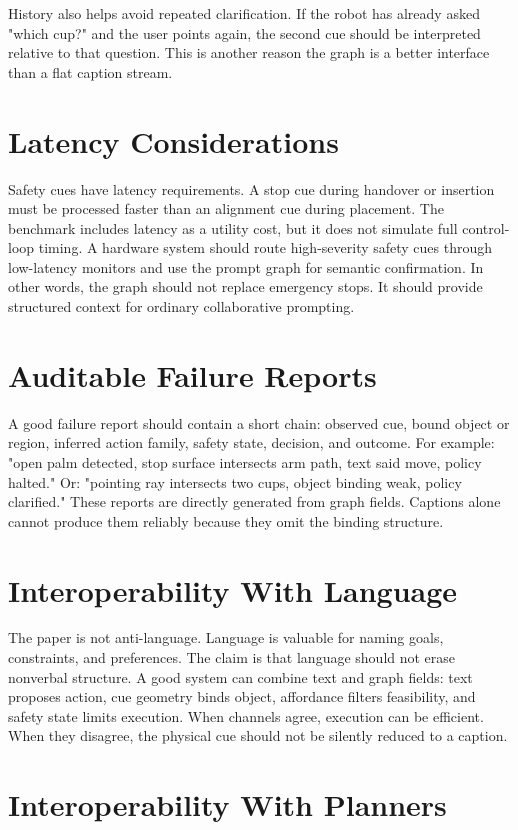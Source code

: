 \documentclass{article}
\begin{document}
History also helps avoid repeated clarification. If the robot has already asked "which cup?" and the user points again, the second cue should be interpreted relative to that question. This is another reason the graph is a better interface than a flat caption stream.

\section{Latency Considerations}

Safety cues have latency requirements. A stop cue during handover or insertion must be processed faster than an alignment cue during placement. The benchmark includes latency as a utility cost, but it does not simulate full control-loop timing. A hardware system should route high-severity safety cues through low-latency monitors and use the prompt graph for semantic confirmation. In other words, the graph should not replace emergency stops. It should provide structured context for ordinary collaborative prompting.

\section{Auditable Failure Reports}

A good failure report should contain a short chain: observed cue, bound object or region, inferred action family, safety state, decision, and outcome. For example: "open palm detected, stop surface intersects arm path, text said move, policy halted." Or: "pointing ray intersects two cups, object binding weak, policy clarified." These reports are directly generated from graph fields. Captions alone cannot produce them reliably because they omit the binding structure.

\section{Interoperability With Language}

The paper is not anti-language. Language is valuable for naming goals, constraints, and preferences. The claim is that language should not erase nonverbal structure. A good system can combine text and graph fields: text proposes action, cue geometry binds object, affordance filters feasibility, and safety state limits execution. When channels agree, execution can be efficient. When they disagree, the physical cue should not be silently reduced to a caption.

\section{Interoperability With Planners}
\end{document}
